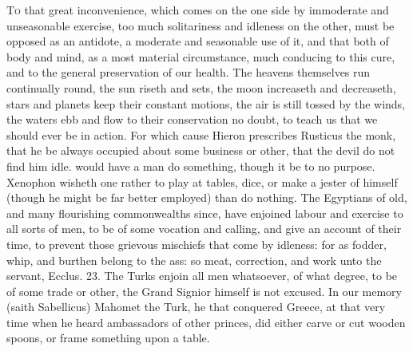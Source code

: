 {\lettrine{T}{o} that great inconvenience, which comes on the one side by immoderate
and unseasonable exercise, too much solitariness and idleness on the
other, must be opposed as an antidote, a moderate and seasonable use of
it, and that both of body and mind, as a most material circumstance,
much conducing to this cure, and to the general preservation of our
health. The heavens themselves run continually round, the sun riseth
and sets, the moon increaseth and decreaseth, stars and planets keep
their constant motions, the air is still tossed by the winds, the
waters ebb and flow to their conservation no doubt, to teach us that we
should ever be in action. For which cause Hieron prescribes Rusticus
the monk, that he be always occupied about some business or other,
that the devil do not find him idle. \Seneca would have a
man do something, though it be to no purpose. Xenophon wisheth
one rather to play at tables, dice, or make a jester of himself (though
he might be far better employed) than do nothing. The Egyptians
of old, and many flourishing commonwealths since, have enjoined labour
and exercise to all sorts of men, to be of some vocation and calling,
and give an account of their time, to prevent those grievous mischiefs
that come by idleness: for as fodder, whip, and burthen belong to the
ass: so meat, correction, and work unto the servant, Ecclus. 
23. The Turks enjoin all men whatsoever, of what degree, to be of some
trade or other, the Grand Signior himself is not excused. In our
memory (saith Sabellicus) Mahomet the Turk, he that conquered Greece,
at that very time when he heard ambassadors of other princes, did
either carve or cut wooden spoons, or frame something upon a table.

}
